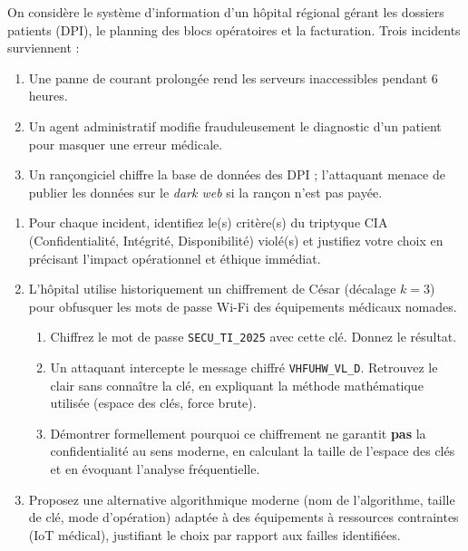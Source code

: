 \documentclass[11pt]{article}
\begin{document}
\begin{exercice}
\label{exo:cia_cesar}
On considère le système d'information d'un hôpital régional gérant les dossiers patients (DPI), le planning des blocs opératoires et la facturation. Trois incidents surviennent :
\begin{enumerate}
    \item Une panne de courant prolongée rend les serveurs inaccessibles pendant 6 heures.
    \item Un agent administratif modifie frauduleusement le diagnostic d'un patient pour masquer une erreur médicale.
    \item Un rançongiciel chiffre la base de données des DPI ; l'attaquant menace de publier les données sur le \textit{dark web} si la rançon n'est pas payée.
\end{enumerate}
\begin{enumerate}
    \item Pour chaque incident, identifiez le(s) critère(s) du triptyque CIA (Confidentialité, Intégrité, Disponibilité) violé(s) et justifiez votre choix en précisant l'impact opérationnel et éthique immédiat.
    \item L'hôpital utilise historiquement un chiffrement de César (décalage $k=3$) pour obfusquer les mots de passe Wi-Fi des équipements médicaux nomades.
\begin{enumerate}
            \item Chiffrez le mot de passe \texttt{SECU\_TI\_2025} avec cette clé. Donnez le résultat.
            \item Un attaquant intercepte le message chiffré \texttt{VHFUHW\_VL\_D}. Retrouvez le clair sans connaître la clé, en expliquant la méthode mathématique utilisée (espace des clés, force brute).
            \item Démontrer formellement pourquoi ce chiffrement ne garantit \textbf{pas} la confidentialité au sens moderne, en calculant la taille de l'espace des clés et en évoquant l'analyse fréquentielle.
        \end{enumerate}
    \item Proposez une alternative algorithmique moderne (nom de l'algorithme, taille de clé, mode d'opération) adaptée à des équipements à ressources contraintes (IoT médical), justifiant le choix par rapport aux failles identifiées.
\end{enumerate}
\end{exercice}
\end{document}
